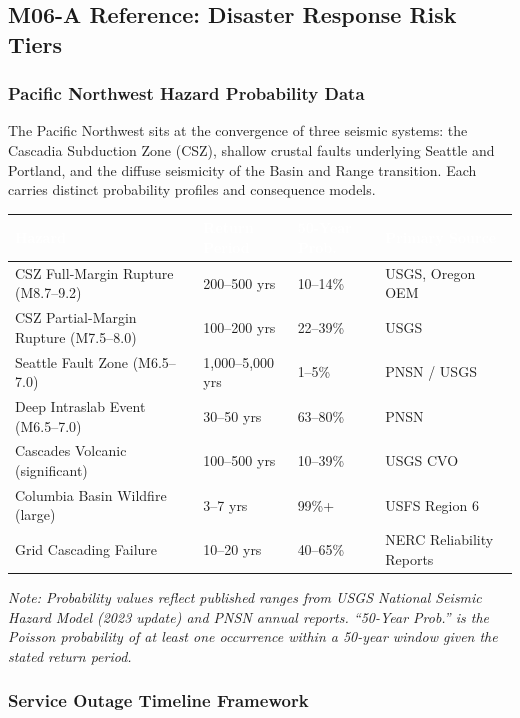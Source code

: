 \documentclass[11pt,letterpaper]{article}
\newcommand{\tableheader}[1]{\textbf{\sffamily\textcolor{white}{#1}}}
\begin{document}
\subsection{M06-A Reference: Disaster Response Risk Tiers}

\subsubsection{Pacific Northwest Hazard Probability Data}

The Pacific Northwest sits at the convergence of three seismic systems: the Cascadia Subduction Zone (CSZ), shallow crustal faults underlying Seattle and Portland, and the diffuse seismicity of the Basin and Range transition. Each carries distinct probability profiles and consequence models.

\begin{center}
\begin{tabularx}{\textwidth}{L{3.5cm}C{2.5cm}C{2.5cm}X}
\toprule
{}
\tableheader{Hazard} & \tableheader{Return Period} & \tableheader{50-Year Prob.} & \tableheader{Primary Source} \\
\midrule
CSZ Full-Margin Rupture (M8.7--9.2) & 200--500 yrs & 10--14\% & USGS, Oregon OEM \\
CSZ Partial-Margin Rupture (M7.5--8.0) & 100--200 yrs & 22--39\% & USGS \\
Seattle Fault Zone (M6.5--7.0) & 1,000--5,000 yrs & 1--5\% & PNSN / USGS \\
Deep Intraslab Event (M6.5--7.0) & 30--50 yrs & 63--80\% & PNSN \\
Cascades Volcanic (significant) & 100--500 yrs & 10--39\% & USGS CVO \\
Columbia Basin Wildfire (large) & 3--7 yrs & 99\%+ & USFS Region 6 \\
Grid Cascading Failure & 10--20 yrs & 40--65\% & NERC Reliability Reports \\
\bottomrule
\end{tabularx}
\end{center}

\textit{Note: Probability values reflect published ranges from USGS National Seismic Hazard Model (2023 update) and PNSN annual reports. ``50-Year Prob.'' is the Poisson probability of at least one occurrence within a 50-year window given the stated return period.}

\subsubsection{Service Outage Timeline Framework}
\end{document}
